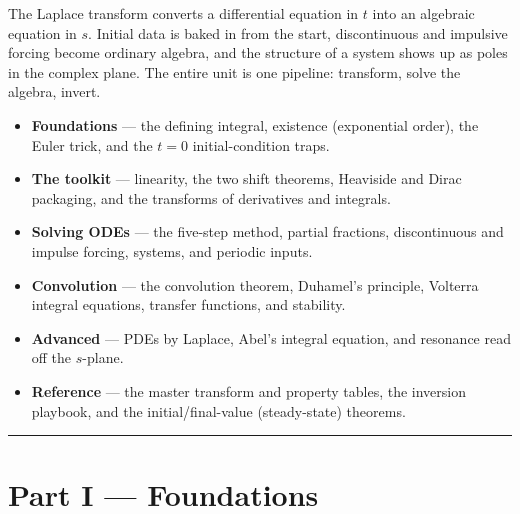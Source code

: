 \begin{topicsbox}
The Laplace transform converts a differential equation in $t$ into an algebraic
equation in $s$. Initial data is baked in from the start, discontinuous and
impulsive forcing become ordinary algebra, and the structure of a system shows up
as poles in the complex plane. The entire unit is one pipeline: transform, solve
the algebra, invert.
\begin{itemize}[leftmargin=1.4em, itemsep=3pt]
    \item \textbf{Foundations} --- the defining integral, existence (exponential
          order), the Euler trick, and the $t=0$ initial-condition traps.
    \item \textbf{The toolkit} --- linearity, the two shift theorems, Heaviside
          and Dirac packaging, and the transforms of derivatives and integrals.
    \item \textbf{Solving ODEs} --- the five-step method, partial fractions,
          discontinuous and impulse forcing, systems, and periodic inputs.
    \item \textbf{Convolution} --- the convolution theorem, Duhamel's principle,
          Volterra integral equations, transfer functions, and stability.
    \item \textbf{Advanced} --- PDEs by Laplace, Abel's integral equation, and
          resonance read off the $s$-plane.
    \item \textbf{Reference} --- the master transform and property tables, the
          inversion playbook, and the initial/final-value (steady-state) theorems.
\end{itemize}
\end{topicsbox}

\vspace{0.6em}
\hrule
\vspace{0.6em}

{}
\section*{Part I --- Foundations}
\setcounter{section}{12}   %

